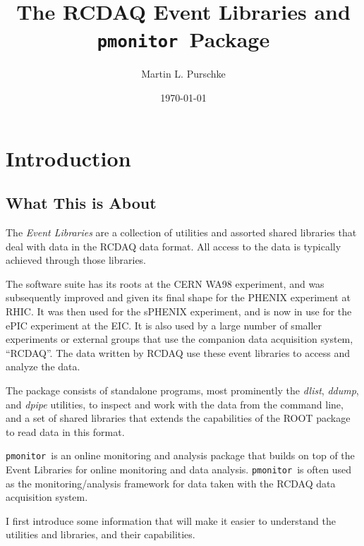 \documentclass{article}[11pt]
\newcommand{\pmonitor}{{\tt pmonitor}}
\begin{document}
\title{The RCDAQ Event Libraries and \pmonitor\  Package}
\author{Martin L. Purschke}
\date{\today}
\maketitle

\tableofcontents




\newpage

\section{Introduction}


\subsection{What This is About}

The \emph{Event Libraries} are a collection of utilities and assorted
shared libraries that deal with data in the RCDAQ data format. All
access to the data is typically achieved through those libraries.

The software suite has its roots at the CERN WA98 experiment, and was
subsequently improved and given its final shape for the PHENIX
experiment at RHIC. It was then used for the sPHENIX experiment, and
is now in use for the ePIC experiment at the EIC. It is also used by a large number of smaller experiments
or external groups that use the companion data acquisition system,
``RCDAQ''. The data written by RCDAQ use these event libraries to
access and analyze the data.

The package consists of standalone programs, most prominently the
\emph{dlist}, \emph{ddump}, and \emph{dpipe} utilities, to inspect and
work with the data from the command line, and a set of shared libraries
that extends the capabilities of the ROOT package to read data in this
format.

\pmonitor\ is an online monitoring and analysis package that builds on
top of the Event Libraries for online monitoring and data
analysis. \pmonitor\  is often used as the monitoring/analysis
framework for data taken with the RCDAQ data acquisition system.



I first introduce some information that will make it easier to
understand the utilities and libraries, and their capabilities.
\end{document}
